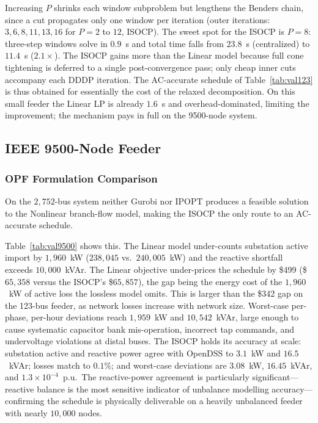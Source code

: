 Increasing $P$ shrinks each window subproblem but lengthens the Benders chain,
since a cut propagates only one window per iteration (outer iterations:
$3, 6, 8, 11, 13, 16$ for $P\!=\!2$ to $12$, ISOCP). The sweet spot for the
ISOCP is $P\!=\!8$: three-step windows solve in $0.9$~s and total time falls
from $23.8$~s (centralized) to $11.4$~s ($2.1\times$). The ISOCP gains more than
the Linear model because full cone tightening is deferred to a single
post-convergence pass; only cheap inner cuts accompany each DDDP iteration. The
AC-accurate schedule of Table~\ref{tab:val123} is thus obtained for essentially
the cost of the relaxed decomposition. On this small feeder the Linear LP is
already $1.6$~s and overhead-dominated, limiting the improvement; the mechanism
pays in full on the 9500-node system.

\subsection{IEEE 9500-Node Feeder}
\label{ssec:case9500}

\subsubsection{OPF Formulation Comparison}
\label{sssec:9500_valid}

On the $2{,}752$-bus system neither Gurobi nor IPOPT produces a feasible
solution to the Nonlinear branch-flow model, making the ISOCP the only route
to an AC-accurate schedule.

Table~\ref{tab:val9500} shows this. The Linear model under-counts substation
active import by $1{,}960$~kW ($238{,}045$ vs.\ $240{,}005$~kW) and the
reactive shortfall exceeds $10{,}000$~kVAr. The Linear objective under-prices the schedule by \$499 (\$$65{,}358$
versus the ISOCP's \$$65{,}857$), the gap being the energy cost of the
$1{,}960$~kW of active loss the lossless model omits. This is larger than the \$342 gap on the 123-bus feeder, as network losses
increase with network size.
Worst-case per-phase, per-hour
deviations reach $1{,}959$~kW and $10{,}542$~kVAr, large enough to cause
systematic capacitor bank mis-operation, incorrect tap commands, and undervoltage
violations at distal buses. The ISOCP holds its accuracy at scale: substation
active and reactive power agree with OpenDSS to $3.1$~kW and $16.5$~kVAr;
losses match to $0.1\%$; and worst-case deviations are $3.08$~kW, $16.45$~kVAr,
and $1.3\times10^{-4}$~p.u.\ The reactive-power agreement is particularly
significant---reactive balance is the most sensitive indicator of unbalance
modelling accuracy---confirming the schedule is physically deliverable on a
heavily unbalanced feeder with nearly $10{,}000$ nodes.

